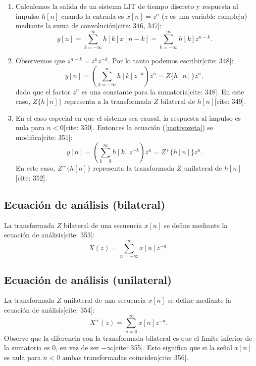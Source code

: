 \documentclass[11pt,a4paper,openany]{book}
\begin{document}
\begin{enumerate}
	
	\item Calculemos la salida de un sistema LIT de tiempo discreto y respuesta al impulso $h[n]$ cuando la entrada es $x[n] = z^{n}$ ($z$ es una variable compleja) mediante la suma de convoluci\'{o}n[cite: 346, 347]:
	\begin{equation}
		y[n] = \sum_{k=-\infty}^{\infty} h[k] x[n-k] = \sum_{k=-\infty}^{\infty} h[k] z^{n-k}.
	\end{equation}
	
	\item Observemos que $z^{n-k} = z^{n} z^{-k}$. Por lo tanto podemos escribir[cite: 348]:
	\begin{equation}
		y[n] = \left(\sum_{k=-\infty}^{\infty} h[k] z^{-k} \right) z^{n} = Z\{h[n]\} z^{n}, \label{motivozeta}
	\end{equation}
	dado que el factor $z^{n}$ es una constante para la sumatoria[cite: 348]. En este caso, $Z\{h[n]\}$ representa a la transformada $Z$ bilateral de $h[n]$[cite: 349].
	
	\item En el caso especial en que el sistema sea causal, la respuesta al impulso es nula para $n<0$[cite: 350]. Entonces la ecuaci\'{o}n (\ref{motivozeta}) se modifica[cite: 351]:
	\begin{equation}
		y[n] = \left(\sum_{k=0}^{\infty} h[k] z^{-k} \right) z^{n} = Z^{+}\{h[n]\} z^{n}.
	\end{equation}
	En este caso, $Z^{+}\{h[n]\}$ representa la transformada $Z$ unilateral de $h[n]$[cite: 352].
\end{enumerate}

\subsection{Ecuaci\'{o}n de an\'{a}lisis (bilateral)}
La transformada $Z$ bilateral de una secuencia $x[n]$ se define mediante la ecuaci\'{o}n de an\'{a}lisis[cite: 353]:
\begin{equation}
	X(z) = \sum_{n=-\infty}^{\infty} x[n] z^{-n}.
\end{equation}

\subsection{Ecuaci\'{o}n de an\'{a}lisis (unilateral)}
La transformada $Z$ unilateral de una secuencia $x[n]$ se define mediante la ecuaci\'{o}n de an\'{a}lisis[cite: 354]:
\begin{equation}
	X^{+}(z) = \sum_{n=0}^{\infty} x[n] z^{-n}.
\end{equation}
Observe que la diferencia con la transformada bilateral es que el l\'{\i}mite inferior de la sumatoria es $0$, en vez de ser $-\infty$[cite: 355]. Esto significa que si la se\~{n}al $x[n]$ es nula para $n < 0$ ambas transformadas coinciden[cite: 356].
\end{document}
